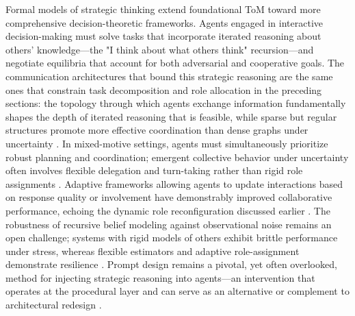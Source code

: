 \documentclass[11pt,a4paper]{article}
\begin{document}
Formal models of strategic thinking extend foundational ToM toward more comprehensive decision-theoretic frameworks. Agents engaged in interactive decision-making must solve tasks that incorporate iterated reasoning about others' knowledge---the "I think about what others think" recursion---and negotiate equilibria that account for both adversarial and cooperative goals. The communication architectures that bound this strategic reasoning are the same ones that constrain task decomposition and role allocation in the preceding sections: the topology through which agents exchange information fundamentally shapes the depth of iterated reasoning that is feasible, while sparse but regular structures promote more effective coordination than dense graphs under uncertainty \cite{arxiv:2505.23352v1}. In mixed-motive settings, agents must simultaneously prioritize robust planning and coordination; emergent collective behavior under uncertainty often involves flexible delegation and turn-taking rather than rigid role assignments \cite{arxiv:2602.19843v1}. Adaptive frameworks allowing agents to update interactions based on response quality or involvement have demonstrably improved collaborative performance, echoing the dynamic role reconfiguration discussed earlier \cite{arxiv:2510.00685v2}. The robustness of recursive belief modeling against observational noise remains an open challenge; systems with rigid models of others exhibit brittle performance under stress, whereas flexible estimators and adaptive role-assignment demonstrate resilience \cite{arxiv:2510.00685v2}. Prompt design remains a pivotal, yet often overlooked, method for injecting strategic reasoning into agents---an intervention that operates at the procedural layer and can serve as an alternative or complement to architectural redesign \cite{arxiv:2510.05174v4}.
\end{document}
